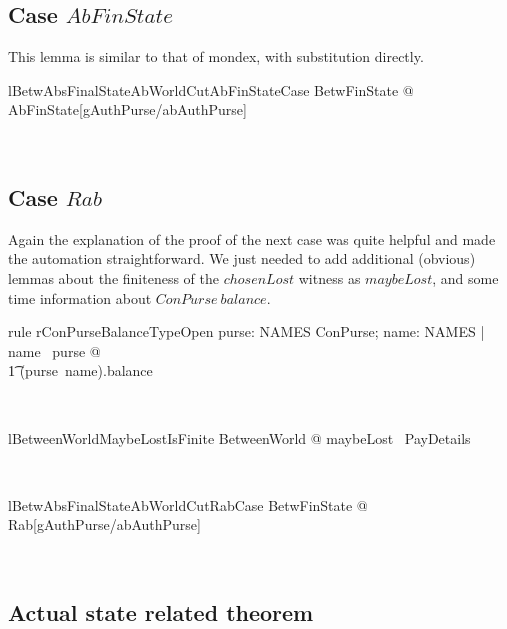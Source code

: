\subsection{Case $AbFinState$}

This lemma is similar to that of mondex, with substitution directly.
%
\begin{LLemma}
\begin{theorem}{lBetwAbsFinalStateAbWorldCutAbFinStateCase}
    \forall BetwFinState @ AbFinState[gAuthPurse/abAuthPurse]
\end{theorem}~\end{LLemma}

\subsection{Case $Rab$}

Again the explanation of the proof of the next case was quite helpful and made
the automation straightforward. We just needed to add additional (obvious) lemmas
about the finiteness of the $chosenLost$ witness as $maybeLost$, and some time
information about $ConPurse~balance$.
%
\begin{LRRT}
\begin{theorem}{rule rConPurseBalanceTypeOpen}
    \forall  purse: NAMES \ffun ConPurse; name: NAMES | name \in \dom~purse @ \\
        \t1 (purse~name).balance \in \nat
\end{theorem}~\end{LRRT}

\begin{LNewLemma}
\begin{theorem}{lBetweenWorldMaybeLostIsFinite}
    \forall BetweenWorld @ maybeLost \in \finset~PayDetails
\end{theorem}~\end{LNewLemma}
%
\begin{LLemma}
\begin{theorem}{lBetwAbsFinalStateAbWorldCutRabCase}
    \forall BetwFinState @ Rab[gAuthPurse/abAuthPurse]
\end{theorem}~\end{LLemma}

\subsection{Actual state related theorem}

